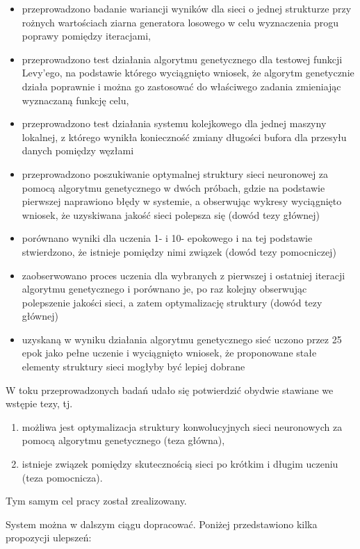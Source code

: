 \begin{itemize}
  \item przeprowadzono badanie wariancji wyników dla sieci o jednej strukturze przy rożnych wartościach ziarna generatora losowego w celu wyznaczenia progu poprawy pomiędzy iteracjami,
  \item przeprowadzono test działania algorytmu genetycznego dla testowej funkcji Levy'ego, na podstawie którego wyciągnięto wniosek, że algorytm genetycznie działa poprawnie i można go zastosować do właściwego zadania zmieniając wyznaczaną funkcję celu,
  \item przeprowadzono test działania systemu kolejkowego dla jednej maszyny lokalnej, z którego wynikła konieczność zmiany długości bufora dla przesyłu danych pomiędzy węzłami
  \item przeprowadzono poszukiwanie optymalnej struktury sieci neuronowej za pomocą algorytmu genetycznego w dwóch próbach, gdzie na podstawie pierwszej naprawiono błędy w systemie, a obserwując wykresy wyciągnięto wniosek, że uzyskiwana jakość sieci polepsza się (dowód tezy głównej)
  \item porównano wyniki dla uczenia 1- i 10- epokowego i na tej podstawie stwierdzono, że istnieje pomiędzy nimi związek (dowód tezy pomocniczej)
  \item zaobserwowano proces uczenia dla wybranych z pierwszej i ostatniej iteracji algorytmu genetycznego i porównano je, po raz kolejny obserwując polepszenie jakości sieci, a zatem optymalizację struktury (dowód tezy głównej)
  \item uzyskaną w wyniku działania algorytmu genetycznego sieć uczono przez 25 epok jako pełne uczenie i wyciągnięto wniosek, że proponowane stałe elementy struktury sieci mogłyby być lepiej dobrane
\end{itemize}

W toku przeprowadzonych badań udało się potwierdzić obydwie stawiane we wstępie tezy, tj.

\begin{enumerate}
  \item możliwa jest optymalizacja struktury konwolucyjnych sieci neuronowych za pomocą algorytmu genetycznego (teza główna),
  \item istnieje związek pomiędzy skutecznością sieci po krótkim i długim uczeniu (teza pomocnicza).
\end{enumerate}

Tym samym cel pracy został zrealizowany.

System można w dalszym ciągu dopracować.
Poniżej przedstawiono kilka propozycji ulepszeń:

